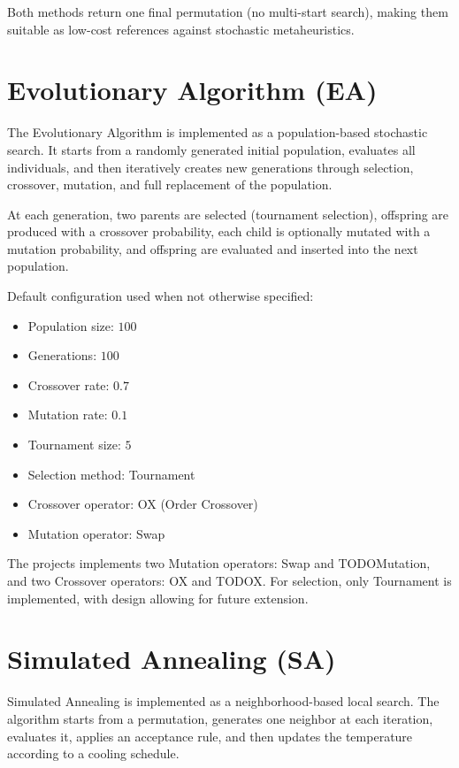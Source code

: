 \documentclass[12pt,a4paper]{report}
\begin{document}
Both methods return one final permutation (no multi-start search), making them suitable as low-cost references against stochastic metaheuristics.

\section{Evolutionary Algorithm (EA)}
The Evolutionary Algorithm is implemented as a population-based stochastic search. It starts from a randomly generated initial population, evaluates all individuals, and then iteratively creates new generations through selection, crossover, mutation, and full replacement of the population.

At each generation, two parents are selected (tournament selection), offspring are produced with a crossover probability, each child is optionally mutated with a mutation probability, and offspring are evaluated and inserted into the next population.

Default configuration used when not otherwise specified:
\begin{itemize}
    \item Population size: $100$
    \item Generations: $100$
    \item Crossover rate: $0.7$
    \item Mutation rate: $0.1$
    \item Tournament size: $5$
    \item Selection method: Tournament
    \item Crossover operator: OX (Order Crossover)
    \item Mutation operator: Swap
\end{itemize}

The projects implements two Mutation operators: Swap and TODOMutation, and two Crossover operators: OX and TODOX. For selection, only Tournament is implemented, with design allowing for future extension.

\section{Simulated Annealing (SA)}
Simulated Annealing is implemented as a neighborhood-based local search. The algorithm starts from a permutation, generates one neighbor at each iteration, evaluates it, applies an acceptance rule, and then updates the temperature according to a cooling schedule.
\end{document}
